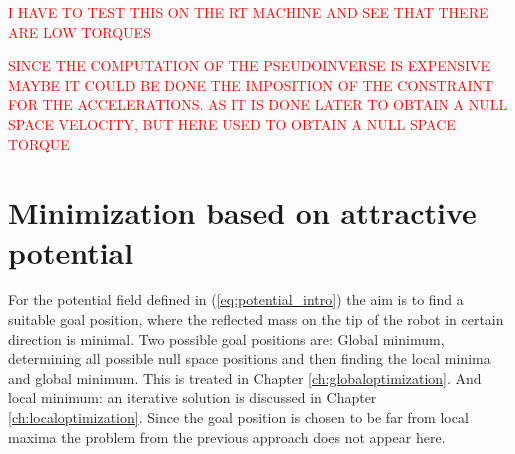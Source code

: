  \textcolor{red}{I HAVE TO TEST THIS ON THE RT MACHINE AND SEE THAT THERE ARE LOW TORQUES}
 
 
\textcolor{red}{ SINCE THE COMPUTATION OF THE PSEUDOINVERSE IS EXPENSIVE MAYBE IT COULD BE DONE THE IMPOSITION OF THE CONSTRAINT FOR THE ACCELERATIONS. AS IT IS DONE LATER TO OBTAIN A NULL SPACE VELOCITY, BUT HERE USED TO OBTAIN A NULL SPACE TORQUE}




%
%
%














\section{Minimization based on attractive potential}
\label{sec:Minimattractivepotential}




For the potential field  defined in (\ref{eq:potential_intro}) the aim is to find a suitable goal position, where the reflected mass on the tip of the robot in certain direction is minimal. Two possible goal positions are: Global minimum, determining all possible null space positions and then finding the local minima and global minimum. This is treated in  Chapter \ref{ch:globaloptimization}. And local minimum: an iterative solution is discussed in  Chapter \ref{ch:localoptimization}.
Since the goal position is chosen to be far from local maxima the problem from the previous approach does not appear here.

